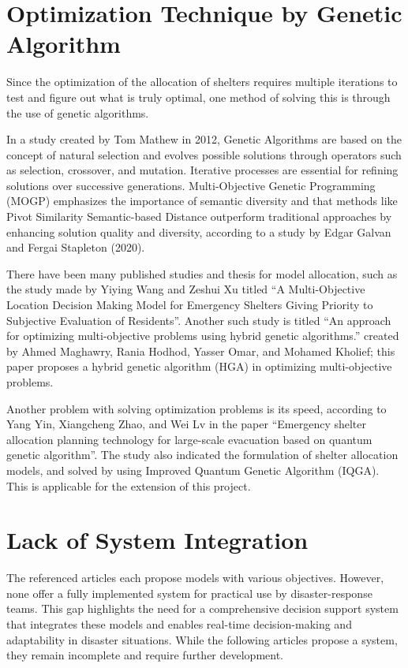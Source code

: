 \section{Optimization Technique by Genetic Algorithm}

	Since the optimization of the allocation of shelters requires multiple iterations to test and figure out what is truly optimal, one method of solving this is through the use of genetic algorithms.
	
	In a study created by Tom Mathew in 2012, Genetic Algorithms are based on the concept of natural selection and evolves possible solutions through operators such as selection, crossover, and mutation. Iterative processes are essential for refining solutions over successive generations. Multi-Objective Genetic Programming (MOGP) emphasizes the importance of semantic diversity and that methods like Pivot Similarity Semantic-based Distance outperform traditional approaches by enhancing solution quality and diversity, according to a study by Edgar Galvan and Fergai Stapleton (2020). \parencite{Mathew2012}
	
	There have been many published studies and thesis for model allocation, such as the study made by Yiying Wang and Zeshui Xu titled “A Multi-Objective Location Decision Making Model for Emergency Shelters Giving Priority to Subjective Evaluation of Residents”. Another such study is titled “An approach for optimizing multi-objective problems using hybrid genetic algorithms.” created by Ahmed Maghawry, Rania Hodhod, Yasser Omar, and Mohamed Kholief; this paper proposes a hybrid genetic algorithm (HGA) in optimizing multi-objective problems. \parencite{Yiying2022}
	
	Another problem with solving optimization problems is its speed, according to Yang Yin, Xiangcheng Zhao, and Wei Lv in the paper “Emergency shelter allocation planning technology for large-scale evacuation based on quantum genetic algorithm”. The study also indicated the formulation of shelter allocation models, and solved by using Improved Quantum Genetic Algorithm (IQGA). This is applicable for the extension of this project. \parencite{Yin2023}

\section{Lack of System Integration}
	The referenced articles each propose models with various objectives. However, none offer a fully implemented system for practical use by disaster-response teams. This gap highlights the need for a comprehensive decision support system that integrates these models and enables real-time decision-making and adaptability in disaster situations. While the following articles propose a system, they remain incomplete and require further development.
	
